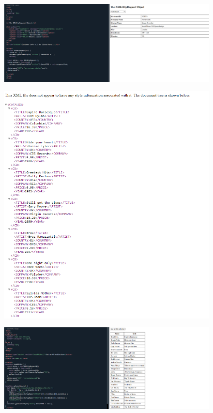 \documentclass{article}
\begin{document}
\begin{itemize}
		\begin{figure}[H]
			\centering
			\includegraphics[width=1.0\textwidth,keepaspectratio]{img/F11.png}
		\end{figure}
		\begin{figure}[H]
			\centering
			\includegraphics[width=1.0\textwidth,keepaspectratio]{img/F12.png}
		\end{figure}

		\begin{figure}[H]
			\centering
			\includegraphics[width=1.0\textwidth,keepaspectratio]{img/F13.png}
		\end{figure}



\end{itemize}
\end{document}
